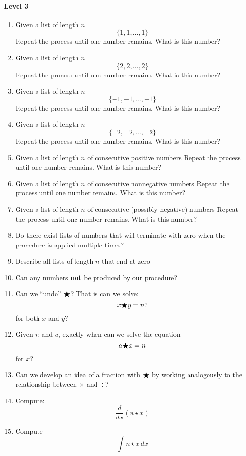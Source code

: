 \documentclass[nooutcomes]{ximera}
\begin{document}
\begin{problem}
\begin{freeResponse}
  \paragraph{Level 3}
  \begin{enumerate}
  \item Given a list of length $n$
    \[
    \{1,1, \dots, 1\}
    \]
    Repeat the process until one number remains. What is this number?
  \item Given a list of length $n$
    \[
    \{2,2, \dots, 2\}
    \]
    Repeat the process until one number remains. What is this number?
  \item Given a list of length $n$
    \[
    \{-1,-1, \dots, -1\}
    \]
    Repeat the process until one number remains. What is this number?
  \item Given a list of length $n$
    \[
    \{-2,-2, \dots, -2\}
    \]
    Repeat the process until one number remains. What is this number?
  \item Given a list of length $n$ of consecutive positive numbers
    Repeat the process until one number remains. What is this number?
  \item Given a list of length $n$ of consecutive nonnegative numbers
    Repeat the process until one number remains. What is this number?
  \item Given a list of length $n$ of consecutive (possibly negative)
    numbers Repeat the process until one number remains. What is this
    number?
  \item Do there exist lists of numbers that will terminate with zero
    when the procedure is applied multiple times?
  \item Describe all lists of length $n$ that end at zero.
  \item Can any numbers \textbf{not} be produced by our procedure?
  \item Can we ``undo'' $\bigstar$? That is can we solve:
    \[
    x \bigstar y = n?
    \]
    for both $x$ and $y$?
  \item Given $n$ and $a$, exactly when can we solve the equation
      \[
      a\bigstar x = n
      \]
      for $x$?
      \item Can we develop an idea of a fraction with $\bigstar$ by working
        analogously to the relationship between $\times$ and $\div$?
  \item Compute:
    \[
    \frac{d}{dx} (n\star x)
    \]
  \item Compute
    \[
    \int n\star x \,d x
    \]
  \end{enumerate}
\end{freeResponse}
\end{problem}
\end{document}
